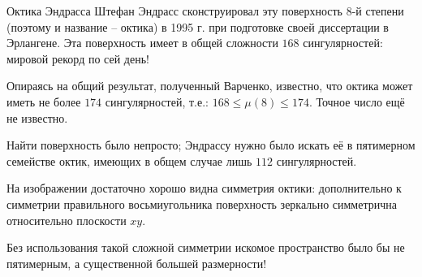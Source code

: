 \begin{surferPage}[Эндрасс]{Октика Эндрасса}
Штефан Эндрасс сконструировал эту поверхность 8-й степени (поэтому и название – октика) в 1995 г. при подготовке своей диссертации в Эрлангене. Эта поверхность имеет в общей сложности $168$ сингулярностей: мировой рекорд по сей день!
  
     Опираясь на общий результат, полученный Варченко, известно, что октика может иметь не более $174$ сингулярностей, т.е.: $168 \le \mu(8) \le 174$. 
    Точное число ещё не известно.

     Найти поверхность было непросто; Эндрассу нужно было искать её в пятимерном семействе октик, имеющих в общем случае лишь $112$ сингулярностей.

На изображении достаточно хорошо видна симметрия октики: дополнительно к симметрии правильного восьмиугольника поверхность зеркально симметрична относительно плоскости $xy$.

Без использования такой сложной симметрии искомое пространство было бы не пятимерным, а существенной большей размерности!
\end{surferPage}
